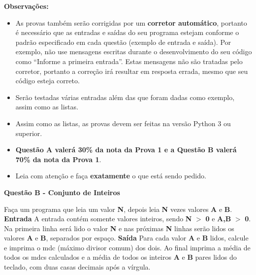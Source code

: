 \documentclass[a4paper, 12pt]{article}
\begin{document}
\textbf{{\large Observações:}}
\begin{itemize}
	\item As provas também serão corrigidas por um \textbf{corretor automático}, portanto é necessário que as entradas e saídas do seu programa estejam conforme o padrão especificado em cada questão (exemplo de entrada e saída). Por exemplo, não use mensagens escritas durante o desenvolvimento do seu código como “Informe a primeira entrada”. Estas mensagens não são tratadas pelo corretor, portanto a correção irá resultar em resposta errada, mesmo que seu código esteja correto.
	\item Serão testadas várias entradas além das que foram dadas como exemplo, assim como as listas.
	\item Assim como as listas, as provas devem ser feitas na versão Python 3 ou superior.
	\item \textbf{Questão A valerá 30\% da nota da Prova 1 e a Questão B valerá 70\% da nota da Prova 1}.
	\item Leia com atenção e faça \textbf{exatamente} o que está sendo pedido.
\end{itemize}
\newpage %
\begin{center}
\textbf{{\Large Questão B - Conjunto de Inteiros}}
\end{center}
\vspace{5pt}
Faça um programa que leia um valor \textbf{N}, depois leia \textbf{N} vezes valores \textbf{A} e \textbf{B}.
\newline \newline
\textbf{{\large Entrada}} \newline
A entrada contém somente valores inteiros, sendo \textbf{N} $>$ \textbf{0} e \textbf{A,B} $>$ \textbf{0}. Na primeira linha será lido o valor \textbf{N} e nas próximas \textbf{N} linhas serão lidos os valores \textbf{A} e \textbf{B}, separados por espaço.
\newline \newline
\textbf{{\large Saída}} \newline
Para cada valor \textbf{A} e \textbf{B} lidos, calcule e imprima o mdc (máximo divisor comum) dos dois. Ao final imprima a média de todos os mdcs calculados e a média de todos os inteiros \textbf{A} e \textbf{B} pares lidos do teclado, com duas casas decimais após a vírgula. 
\newline
\end{document}
